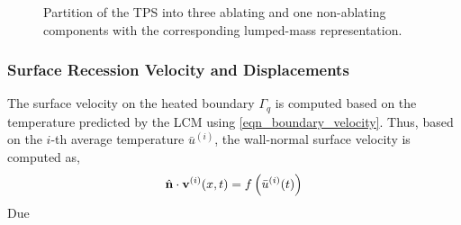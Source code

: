 \begin{figure}
    \centering
    \caption{Partition of the TPS into three ablating and one non-ablating components with the corresponding lumped-mass representation.}
    \label{fig_four_components}
\end{figure}

\subsubsection{Surface Recession Velocity and Displacements}
The surface velocity on the heated boundary $\Gamma_q$ is computed based on the temperature predicted by the LCM using \cref{eqn_boundary_velocity}. Thus, based on the $i$-th average temperature $\bar{u}^{(i)}$, the wall-normal surface velocity is computed as,
\begin{equation}
    \hat{{\mathbf{n}}}\cdot\mathbf{v}^{(i)}(x,t) = f\left(\bar{u}^{(i)}(t)\right)\label{eqn_lcm_boundary_velocity}
\end{equation}
Due 




